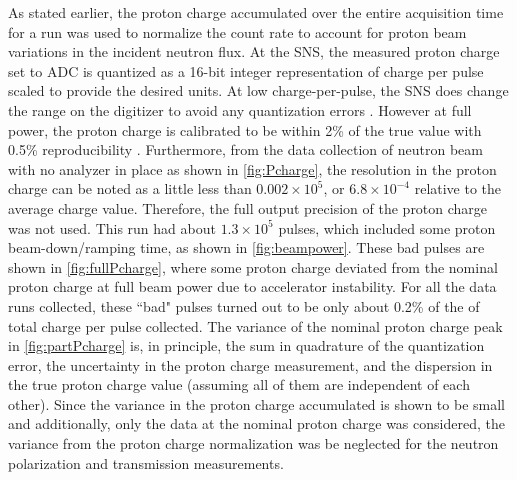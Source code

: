 As stated earlier, the proton charge accumulated over the entire acquisition time for a run was used to normalize the count rate to account for proton beam variations in the incident neutron flux. At the SNS, the measured proton charge set to ADC is quantized as a 16-bit integer representation of charge per pulse scaled to provide the desired units. At low charge-per-pulse, the SNS does change the range on the digitizer to avoid any quantization errors \cite{Blokland2023}. However at full power, the proton charge is calibrated to be within 2\% of the true value with 0.5\% reproducibility \cite{Blokland2023}. Furthermore, from the data collection of neutron beam with no analyzer in place as shown in \cref{fig:Pcharge}, the resolution in the proton charge can be noted as a little less than $0.002\times10^5$, or $6.8\times10^{-4}$ relative to the average charge value. Therefore, the full output precision of the proton charge was not used. This run had about $1.3\times10^5$ pulses, which included some proton beam-down/ramping time, as shown in \cref{fig:beampower}. These bad pulses are shown in \cref{fig:fullPcharge}, where some proton charge deviated from the nominal proton charge at full beam power due to accelerator instability. For all the data runs collected, these ``bad" pulses turned out to be only about 0.2\% of the of total charge per pulse collected. The variance of the nominal proton charge peak in \cref{fig:partPcharge} is, in principle, the sum in quadrature of the quantization error, the uncertainty in the proton charge measurement, and the dispersion in the true proton charge value (assuming all of them are independent of each other). Since the variance in the proton charge accumulated is shown to be small and additionally, only the data at the nominal proton charge was considered, the variance from the proton charge normalization was be neglected for the neutron polarization and transmission measurements.


